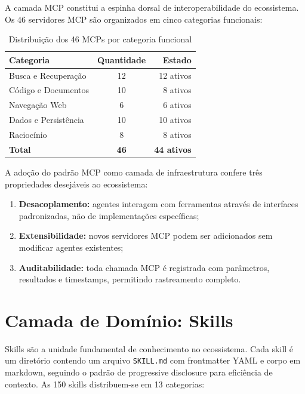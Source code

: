 \documentclass[12pt,a4paper,sumario=tradicional]{abntex2}
\begin{document}
A camada MCP constitui a espinha dorsal de interoperabilidade do ecossistema. Os 46 servidores MCP são organizados em cinco categorias funcionais:

\begin{table}[H]
\centering
\caption{Distribuição dos 46 MCPs por categoria funcional}
\label{tab:mcps}
\begin{tabular}{@{}lcr@{}}
\toprule
\textbf{Categoria} & \textbf{Quantidade} & \textbf{Estado} \\
\midrule
Busca e Recuperação & 12 & 12 ativos \\
Código e Documentos  & 10 & 8 ativos \\
Navegação Web        & 6  & 6 ativos \\
Dados e Persistência & 10 & 10 ativos \\
Raciocínio           & 8  & 8 ativos \\
\midrule
\textbf{Total}       & \textbf{46} & \textbf{44 ativos} \\
\bottomrule
\end{tabular}
\end{table}

A adoção do padrão MCP como camada de infraestrutura confere três propriedades desejáveis ao ecossistema:

\begin{enumerate}
    \item \textbf{Desacoplamento:} agentes interagem com ferramentas através de interfaces padronizadas, não de implementações específicas;
    \item \textbf{Extensibilidade:} novos servidores MCP podem ser adicionados sem modificar agentes existentes;
    \item \textbf{Auditabilidade:} toda chamada MCP é registrada com parâmetros, resultados e timestamps, permitindo rastreamento completo.
\end{enumerate}

\section{Camada de Domínio: Skills}

Skills são a unidade fundamental de conhecimento no ecossistema. Cada skill é um diretório contendo um arquivo \texttt{SKILL.md} com frontmatter YAML e corpo em markdown, seguindo o padrão de progressive disclosure para eficiência de contexto. As 150 skills distribuem-se em 13 categorias:
\end{document}
